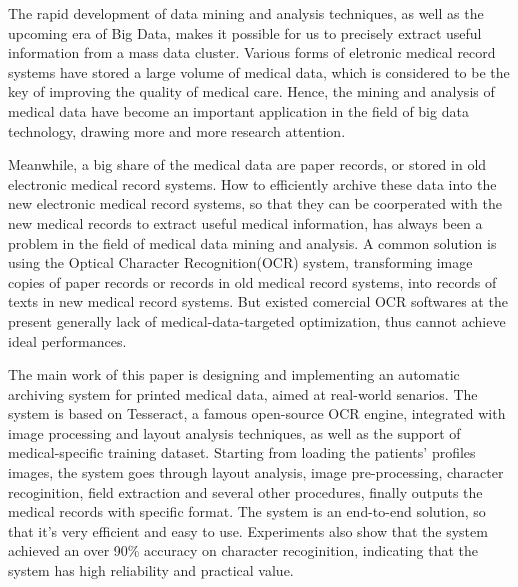 \begin{enabstract}
The rapid development of data mining and analysis techniques, as well as the upcoming era of Big Data, makes it possible for us to precisely extract useful information from a mass data cluster.
Various forms of eletronic medical record systems have stored a large volume of medical data, which is considered to be the key of improving the quality of medical care.
Hence, the mining and analysis of medical data have become an important application in the field of big data technology, drawing more and more research attention.

Meanwhile, a big share of the medical data are paper records, or stored in old electronic medical record systems.
How to efficiently archive these data into the new electronic medical record systems, so that they can be coorperated with the new medical records to extract useful medical information, has always been a problem in the field of medical data mining and analysis.
A common solution is using the Optical Character Recognition(OCR) system, transforming image copies of paper records or records in old medical record systems, into records of texts in new medical record systems.
But existed comercial OCR softwares at the present generally lack of medical-data-targeted optimization, thus cannot achieve ideal performances.

The main work of this paper is designing and implementing an automatic archiving system for printed medical data, aimed at real-world senarios.
The system is based on Tesseract, a famous open-source OCR engine, integrated with image processing and layout analysis techniques, as well as the support of medical-specific training dataset.
Starting from loading the patients' profiles images, the system goes through layout analysis, image pre-processing, character recoginition, field extraction and several other procedures, finally outputs the medical records with specific format.
The system is an end-to-end solution, so that it's very efficient and easy to use.
Experiments also show that the system achieved an over 90\% accuracy on character recoginition, indicating that the system has high reliability and practical value.

\end{enabstract}
